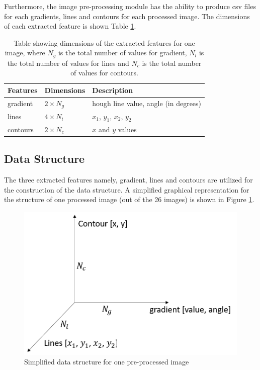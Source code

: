 \documentclass[11pt]{article}
\begin{document}
	Furthermore, the image pre-processing module has the ability to produce csv files for each gradients, lines and contours for each processed image. The dimensions of each extracted feature is shown Table \ref{feature_selection}.
	\begin{table}[!h]
		\centering
		\caption{Table showing dimensions of the extracted features for one image, where $N_g$ is the total number of values for gradient, $N_l$ is the total number of values for lines and $N_c$ is the total number of values for contours.}
		\label{feature_selection}
		\begin{tabular}{|l|l|l|}
			\hline
			Features & Dimensions & Description \\
			\hline \hline
			gradient & $2 \times N_g $ & hough line value, angle (in degrees)\\
			\hline
			lines    & $4 \times N_l $ & $x_{1}$, $y_{1}$, $x_{2}$, $y_{2}$ \\
			\hline
			contours & $2 \times N_c $  & $x$ and $y$ values \\
			\hline
		\end{tabular}
	\end{table}

	\subsection{Data Structure}
	The three extracted features namely, gradient, lines and contours are utilized for the construction of the data structure. A simplified graphical representation for the structure of one processed image (out of the 26 images) is shown in Figure \ref{fig: second_structure}. 
	\begin{figure}[!h]
		\centering
		\includegraphics[scale=0.35]{second_structure.png}
		\caption{Simplified data structure for one pre-processed image}
		\label{fig: second_structure}
	\end{figure}
\end{document}
